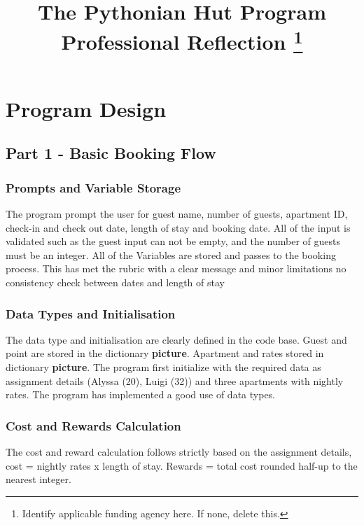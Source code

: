 \documentclass[conference]{IEEEtran}
\begin{document}
\title{The Pythonian Hut Program\\
{\footnotesize Professional Reflection}
\thanks{Identify applicable funding agency here. If none, delete this.}
}

\author{

}

\maketitle

\section{Program Design}
\subsection{Part 1 - Basic Booking Flow}
\subsubsection{Prompts and Variable Storage}
The program prompt the user for guest name, number of guests, apartment ID, check-in and check out date, length of stay and booking date. All of the input is validated such as the guest input can not be empty, and the number of guests must be an integer. All of the Variables are stored and passes to the booking process. This has met the rubric with a clear message and minor limitations no consistency check between dates and length of stay 
\subsubsection{Data Types and Initialisation}
The data type and initialisation are clearly defined in the code base. Guest and point are stored in the dictionary \textbf{picture}. Apartment and rates stored in dictionary \textbf{picture}. The program first initialize with the required data as assignment details (Alyssa (20), Luigi (32)) and three apartments with nightly rates. The program has implemented a good use of data types.
\subsubsection{Cost and Rewards Calculation}
The cost and reward calculation follows strictly based on the assignment details, cost = nightly rates x length of stay. Rewards = total cost rounded half-up to the nearest integer.
\end{document}
